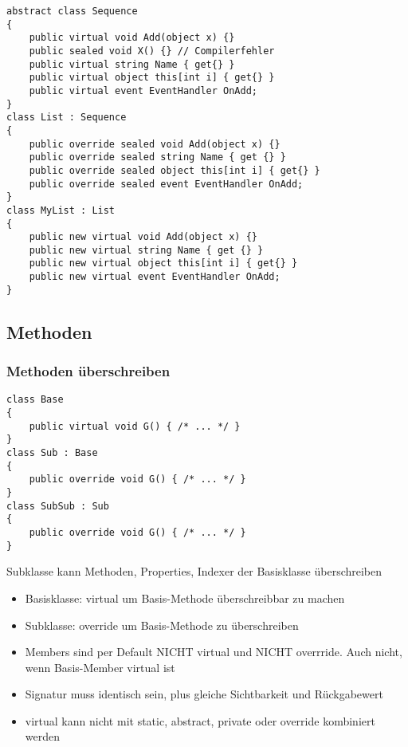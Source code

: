 \begin{multicols*}{2}
\begin{lstlisting}
abstract class Sequence
{
    public virtual void Add(object x) {}
    public sealed void X() {} // Compilerfehler 
    public virtual string Name { get{} }
    public virtual object this[int i] { get{} } 
    public virtual event EventHandler OnAdd;
}
class List : Sequence
{
    public override sealed void Add(object x) {}
    public override sealed string Name { get {} } 
    public override sealed object this[int i] { get{} }
    public override sealed event EventHandler OnAdd;
}
class MyList : List
{
    public new virtual void Add(object x) {}
    public new virtual string Name { get {} } 
    public new virtual object this[int i] { get{} } 
    public new virtual event EventHandler OnAdd;
}
\end{lstlisting}

\subsection{Methoden}
\subsubsection{Methoden überschreiben}
\begin{lstlisting}
class Base 
{
    public virtual void G() { /* ... */ }
}
class Sub : Base 
{
    public override void G() { /* ... */ }
}
class SubSub : Sub
{
    public override void G() { /* ... */ } 
}
\end{lstlisting}
Subklasse kann Methoden, Properties, Indexer der Basisklasse überschreiben
\begin{itemize}
    \item Basisklasse: virtual um Basis-Methode überschreibbar zu machen
    \item Subklasse: override um Basis-Methode zu überschreiben
\end{itemize}
\begin{itemize}
    \item Members sind per Default NICHT virtual und NICHT overrride. Auch nicht, wenn Basis-Member virtual ist
    \item Signatur muss identisch sein, plus gleiche Sichtbarkeit und Rückgabewert
    \item virtual kann nicht mit static, abstract, private oder override kombiniert werden
\end{itemize}

\end{multicols*}
